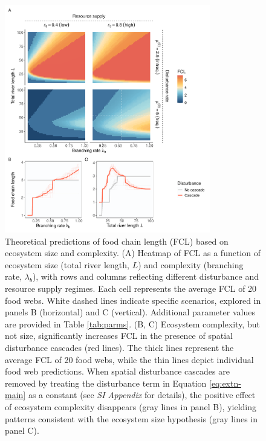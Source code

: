 \documentclass[11pt, class=article, crop=false]{standalone}
\begin{document}
\noindent\makebox[\linewidth]{\rule{\textwidth}{0.4pt}}

\begin{figure}
    \centering
    \includegraphics[width=0.8\textwidth]{output/fig_theo_main.pdf}
    \caption{Theoretical predictions of food chain length (FCL) based on ecosystem size and complexity. (A) Heatmap of FCL as a function of ecosystem size (total river length, $L$) and complexity (branching rate, $\lambda_b$), with rows and columns reflecting different disturbance and resource supply regimes. Each cell represents the average FCL of 20 food webs. White dashed lines indicate specific scenarios, explored in panels B (horizontal) and C (vertical). Additional parameter values are provided in Table \ref{tab:parms}. (B, C) Ecosystem complexity, but not size, significantly increases FCL in the presence of spatial disturbance cascades (red lines). The thick lines represent the average FCL of 20 food webs, while the thin lines depict individual food web predictions. When spatial disturbance cascades are removed by treating the disturbance term in Equation \ref{eq:extn-main} as a constant (see \textit{SI Appendix} for details), the positive effect of ecosystem complexity disappears (gray lines in panel B), yielding patterns consistent with the ecosystem size hypothesis (gray lines in panel C).}
    \label{fig:sim-main}
\end{figure}

\noindent\makebox[\linewidth]{\rule{\textwidth}{0.4pt}}
\end{document}
